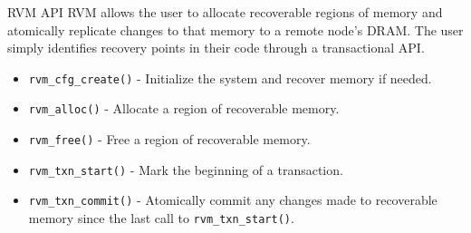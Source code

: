 \begin{block}{RVM API}
    RVM allows the user to allocate recoverable regions of memory and
    atomically replicate changes to that memory to a remote node’s DRAM. The
    user simply identifies recovery points in their code through a
    transactional API.

    \begin{itemize}
        \item \verb|rvm_cfg_create()| - Initialize the system and recover
            memory if needed.
        \item \verb|rvm_alloc()| - Allocate a region of recoverable memory.
        \item \verb|rvm_free()| - Free a region of recoverable memory.
        \item \verb|rvm_txn_start()| - Mark the beginning of a transaction.
        \item \verb|rvm_txn_commit()| - Atomically commit any changes made
            to recoverable memory since the last call to \verb|rvm_txn_start()|.
    \end{itemize}
\end{block}
